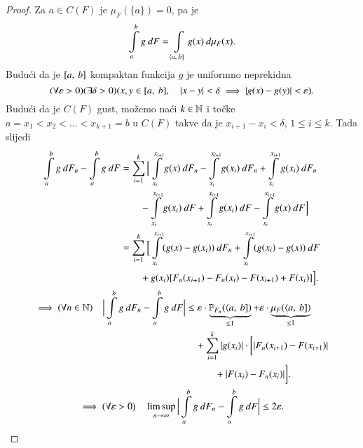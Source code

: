 \begin{proof}
    Za $a \in C(F)$ je $\mu_F (\{ a \}) = 0$, pa je
    \begin{equation*}
        \int\limits_a^b g \: dF = \int\limits_{\langle {a}, \: {b}]} g(x) \: d \mu_F (x).
    \end{equation*}
    Budu\' ci da je $[{a}, \:{b}]$ kompaktan funkcija $g$ je uniformno neprekidna
    \begin{equation*}
        (\forall \varepsilon > 0) (\exists \delta > 0) (x, y \in [{a}, \:{b}], \quad |x - y| < \delta \implies |g(x) - g(y)| < \varepsilon).
    \end{equation*}
    Budu\' ci da je $C(F)$ gust, mo\v zemo na\' ci $k \in \mathbb{N}$ i to\v cke $a = x_1 < x_2 < \ldots < x_{k + 1} = b$ u $C(F)$ takve da je $x_{i + 1} - x_i < \delta$, $1 \leq i \leq k$.
    Tada slijedi
    \begin{equation*}
        \begin{gathered}
            \begin{aligned}
                \int\limits_a^b g \: d F_n - \int\limits_a^b g \: d F &= \sum\limits_{i = 1}^{k} \Big[ \int\limits_{x_i}^{x_{i+1}} g(x) \: d F_n - \int\limits_{x_i}^{x_{i + 1}} g(x_i) \: d F_n + \int\limits_{x_i}^{x_{i+1}} g(x_i) \: d F_n\\
                &\quad \quad- \int\limits_{x_i}^{x_{i + 1}} g(x_i) \: d F + \int\limits_{x_i}^{x_{i + 1}} g(x_i) \: d F - \int\limits_{x_i}^{x_{i + 1}} g(x) \: d F \Big]\\
                &= \sum\limits_{i = 1}^{k} \Big[ \int\limits_{x_i}^{x_{i + 1}} (g (x) - g(x_i)) \: d F_n + \int\limits_{x_i}^{x_{i + 1}} (g(x_i) - g(x)) \: d F\\
                &\quad \quad+ g(x_i) [ F_n (x_{i + 1}) - F_n (x_i) - F (x_{i + 1}) + F(x_i) ] \Big].
            \end{aligned}\\
            \begin{aligned}
                \implies (\forall n \in \mathbb{N}) \quad \Big| \int\limits_a^b g \: d F_n - \int\limits_a^b g \: d F \Big| &\leq \varepsilon \cdot \underbrace{\mathbb{P}_{F_n} (\langle {a}, \: {b}])}_{\leq 1} + \varepsilon \cdot \underbrace{\mu_{F} (\langle {a}, \: {b}])}_{\leq 1}\\
                &\quad + \sum\limits_{i = 1}^{k} | g(x_i) | \cdot \bigg[| F_n (x_{i + 1}) - F (x_{i + 1}) |\\
                &\quad \quad \quad+ | F(x_i) - F_n (x_i) | \bigg].
            \end{aligned}\\
            \implies (\forall \varepsilon > 0) \quad \limsup\limits_{n \to \infty} \Big| \int\limits_a^b g \: d F_n - \int\limits_a^b g \: d F \Big| \leq 2 \varepsilon.
        \end{gathered}
    \end{equation*}
\end{proof}

